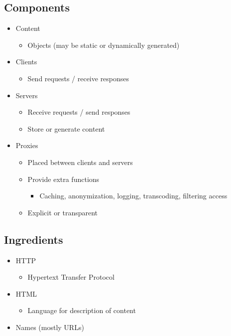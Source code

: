 \subsection{Components}
\begin{itemize}[nosep]
    \item Content
          \begin{itemize}[nosep]
              \item Objects (may be static or dynamically generated)
          \end{itemize}
    \item Clients
          \begin{itemize}[nosep]
              \item Send requests / receive responses
          \end{itemize}
    \item Servers
          \begin{itemize}[nosep]
              \item Receive requests / send responses
              \item Store or generate content
          \end{itemize}
    \item Proxies
          \begin{itemize}[nosep]
              \item Placed between clients and servers
              \item Provide extra functions
                    \begin{itemize}[nosep]
                        \item Caching, anonymization, logging, transcoding, filtering access
                    \end{itemize}
              \item Explicit or transparent
          \end{itemize}
\end{itemize}
\subsection{Ingredients}
\begin{itemize}[nosep]
    \item HTTP
          \begin{itemize}[nosep]
              \item Hypertext Transfer Protocol
          \end{itemize}
    \item HTML
          \begin{itemize}[nosep]
              \item Language for description of content
          \end{itemize}
    \item Names (mostly URLs)
\end{itemize}
